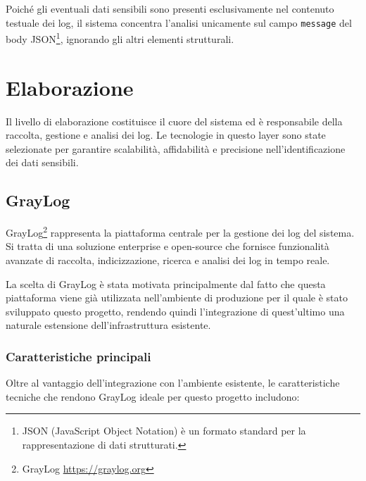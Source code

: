 \documentclass[12pt]{report}
\begin{document}
Poiché gli eventuali dati sensibili sono presenti esclusivamente nel contenuto testuale dei log, il sistema concentra l'analisi unicamente sul campo \texttt{message} del body JSON\footnote{JSON (JavaScript Object Notation) è un formato standard per la rappresentazione di dati strutturati.}, ignorando gli altri elementi strutturali.

\section{Elaborazione}
\label{sec:elaborazione_log}

Il livello di elaborazione costituisce il cuore del sistema ed è responsabile della raccolta, gestione e analisi dei log. Le tecnologie in questo layer sono state selezionate per garantire scalabilità, affidabilità e precisione nell'identificazione dei dati sensibili.

\subsection{GrayLog}
\label{subsec:graylog}

GrayLog\footnote{GrayLog \url{https://graylog.org}} rappresenta la piattaforma centrale per la gestione dei log del sistema. \\
Si tratta di una soluzione enterprise e open-source che fornisce funzionalità avanzate di raccolta, indicizzazione, ricerca e analisi dei log in tempo reale.

La scelta di GrayLog è stata motivata principalmente dal fatto che questa piattaforma viene già utilizzata nell'ambiente di produzione per il quale è stato sviluppato questo progetto, rendendo quindi l'integrazione di quest'ultimo una naturale estensione dell'infrastruttura esistente.

\subsubsection{Caratteristiche principali}
Oltre al vantaggio dell'integrazione con l'ambiente esistente, le caratteristiche tecniche che rendono GrayLog ideale per questo progetto includono:
\end{document}
